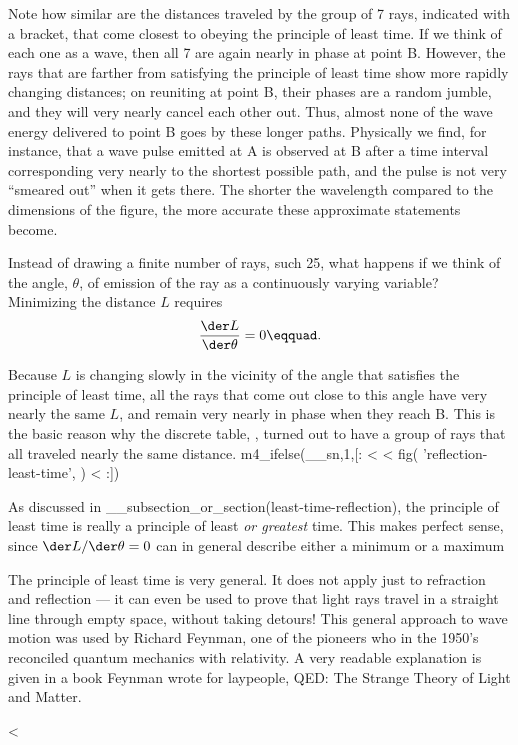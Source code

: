 Note how similar are the distances traveled by the group of
7 rays, indicated with a bracket, that come closest to
obeying the principle of least time. If we think of each one
as a wave, then all 7 are again nearly in phase at point
B. However, the rays that are farther from satisfying the
principle of least time show more rapidly changing
distances; on reuniting at point B, their phases are a
random jumble, and they will very nearly cancel each other
out. Thus, almost none of the wave energy delivered to point
B goes by these longer paths. Physically we find, for
instance, that a wave pulse emitted at A is observed at B
after a time interval corresponding very nearly to the
shortest possible path, and the pulse is not very ``smeared
out'' when it gets there. The shorter the wavelength
compared to the dimensions of the figure, the more accurate
these approximate statements become.

Instead of drawing a finite number of rays, such 25, what
happens if we think of the angle, $\theta $, of emission of
the ray as a continuously varying variable? Minimizing the
distance $L$ requires
\begin{equation*}
        \frac{\der L}{\der\theta} = 0\eqquad.
\end{equation*}

Because $L$ is changing slowly in the vicinity of the angle
that satisfies the principle of least time, all the rays
that come out close to this angle have very nearly the same
$L$, and remain very nearly in phase when they reach B.
This is the basic reason why the discrete table, , turned
out to have a group of rays that all traveled nearly the same distance.
m4_ifelse(__sn,1,[:
<%
<%
  fig(
    'reflection-least-time',
  )
<%
:])

As discussed in __subsection_or_section(least-time-reflection), the principle of least time is
really a principle of least \emph{or greatest} time. This
makes perfect sense, since $\der L/\der \theta =0$ can in general
describe either a minimum or a maximum

The principle of least time is very general. It does not
apply just to refraction and reflection --- it can even be
used to prove that light rays travel in a straight line
through empty space, without taking detours! This general
approach to wave motion was used by Richard Feynman, one of
the pioneers who in the 1950's reconciled quantum mechanics
with relativity. A very readable explanation is
given in a book Feynman wrote for laypeople, QED: The
Strange Theory of Light and Matter.

<%
